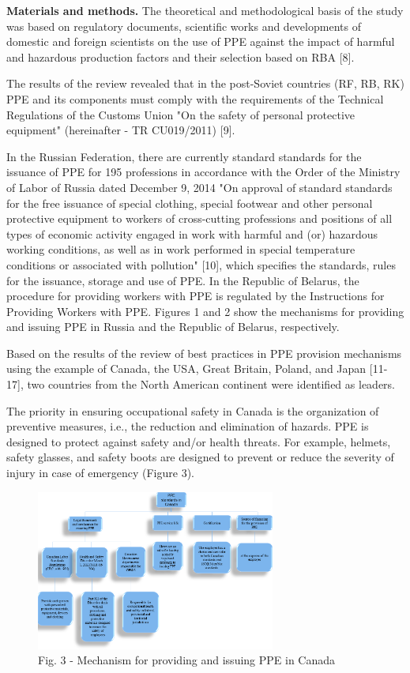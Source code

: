 \begin{multicols}{2}
{\bfseries Materials and methods.} The theoretical and methodological basis
of the study was based on regulatory documents, scientific works and
developments of domestic and foreign scientists on the use of PPE
against the impact of harmful and hazardous production factors and their
selection based on RBA {[}8{]}.

The results of the review revealed that in the post-Soviet countries
(RF, RB, RK) PPE and its components must comply with the requirements of
the Technical Regulations of the Customs Union "On the safety of
personal protective equipment" (hereinafter - TR CU019/2011) {[}9{]}.

In the Russian Federation, there are currently standard standards for
the issuance of PPE for 195 professions in accordance with the Order of
the Ministry of Labor of Russia dated December 9, 2014 "On approval of
standard standards for the free issuance of special clothing, special
footwear and other personal protective equipment to workers of
cross-cutting professions and positions of all types of economic
activity engaged in work with harmful and (or) hazardous working
conditions, as well as in work performed in special temperature
conditions or associated with pollution" {[}10{]}, which specifies the
standards, rules for the issuance, storage and use of PPE. In the
Republic of Belarus, the procedure for providing workers with PPE is
regulated by the Instructions for Providing Workers with PPE. Figures 1
and 2 show the mechanisms for providing and issuing PPE in Russia and
the Republic of Belarus, respectively.

Based on the results of the review of best practices in PPE provision
mechanisms using the example of Canada, the USA, Great Britain, Poland,
and Japan {[}11-17{]}, two countries from the North American continent
were identified as leaders.

The priority in ensuring occupational safety in Canada is the
organization of preventive measures, i.e., the reduction and elimination
of hazards. PPE is designed to protect against safety and/or health
threats. For example, helmets, safety glasses, and safety boots are
designed to prevent or reduce the severity of injury in case of
emergency (Figure 3).
\end{multicols}

\begin{figure}[H]
	\centering
	\includegraphics[width=0.7\textwidth]{media/chem2/image4}
	\caption*{Fig. 3 - Mechanism for providing and issuing PPE in Canada}
\end{figure}

